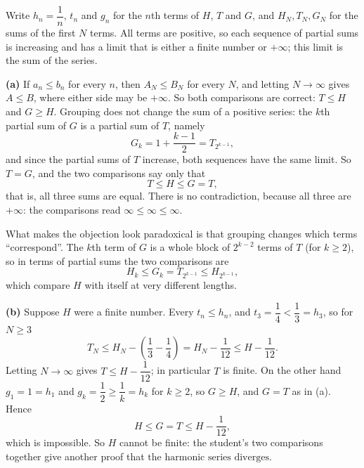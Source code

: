 Write $h_n=\dfrac{1}{n}$, $t_n$ and $g_n$ for the $n$th terms of $H$, $T$ and $G$, and $H_N,T_N,G_N$ for the sums of the first $N$ terms. All terms are positive, so each sequence of partial sums is increasing and has a limit that is either a finite number or $+\infty$; this limit is the sum of the series.

\textbf{(a)} If $a_n\le b_n$ for every $n$, then $A_N\le B_N$ for every $N$, and letting $N\to\infty$ gives $A\le B$, where either side may be $+\infty$. So both comparisons are correct: $T\le H$ and $G\ge H$. Grouping does not change the sum of a positive series: the $k$th partial sum of $G$ is a partial sum of $T$, namely
\[G_k=1+\dfrac{k-1}{2}=T_{2^{k-1}},\]
and since the partial sums of $T$ increase, both sequences have the same limit. So $T=G$, and the two comparisons say only that
\[T\le H\le G=T,\]
that is, all three sums are equal. There is no contradiction, because all three are $+\infty$: the comparisons read $\infty\le\infty\le\infty$.

What makes the objection look paradoxical is that grouping changes which terms ``correspond''. The $k$th term of $G$ is a whole block of $2^{k-2}$ terms of $T$ (for $k\ge2$), so in terms of partial sums the two comparisons are
\[H_k\le G_k=T_{2^{k-1}}\le H_{2^{k-1}},\]
which compare $H$ with itself at very different lengths.

\textbf{(b)} Suppose $H$ were a finite number. Every $t_n\le h_n$, and $t_3=\dfrac{1}{4}<\dfrac{1}{3}=h_3$, so for $N\ge3$
\[T_N\le H_N-\left(\dfrac{1}{3}-\dfrac{1}{4}\right)=H_N-\dfrac{1}{12}\le H-\dfrac{1}{12}.\]
Letting $N\to\infty$ gives $T\le H-\dfrac{1}{12}$; in particular $T$ is finite. On the other hand $g_1=1=h_1$ and $g_k=\dfrac{1}{2}\ge\dfrac{1}{k}=h_k$ for $k\ge2$, so $G\ge H$, and $G=T$ as in (a). Hence
\[H\le G=T\le H-\dfrac{1}{12},\]
which is impossible. So $H$ cannot be finite: the student's two comparisons together give another proof that $\boxed{\text{the harmonic series diverges}}$.
